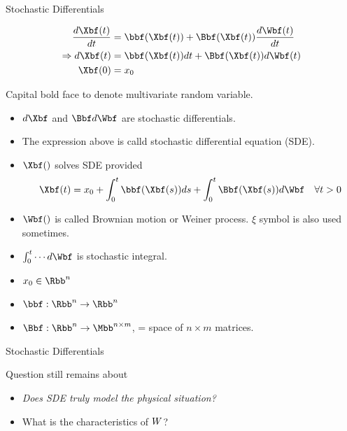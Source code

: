 \documentclass[aspectratio=169,xcolor=dvipsnames,svgnames,x11names,fleqn]{beamer}
\begin{document}
\begin{frame}{Stochastic Differentials}

    \footnotesize
    
    \begin{align*}
        \frac{d\Xbf(t)}{dt} & = \bbf(\Xbf(t)) + \Bbf(\Xbf(t))\frac{d\Wbf(t)}{dt}\\
        \Rightarrow d\Xbf(t) & = \bbf(\Xbf(t))dt + \Bbf(\Xbf(t))d\Wbf(t)\\
        \Xbf(0) & = x_0
    \end{align*}

    \vspace{3pt}
    Capital bold face to denote multivariate random variable.
    \vspace{3pt}

    \begin{itemize}
        \item $d\Xbf$ and $\Bbf d\Wbf$ are stochastic differentials.
        \item The expression above is calld stochastic differential equation (SDE).
        \item $\Xbf()$ solves SDE provided
        \begin{align*}
            \Xbf(t) = x_0 + \int_0^t \bbf (\Xbf (s))ds + \int_0^t \Bbf(\Xbf(s))d\Wbf \quad \forall t > 0
        \end{align*}

        \item $\Wbf()$ is called Brownian motion or Weiner process. $\xi$ symbol is also used sometimes.
        \item $\int_0^t \cdots d\Wbf$ is stochastic integral.
        \item $x_0 \in \Rbb^n$
        \item $\bbf: \Rbb^n \to \Rbb^n$
        \item $\Bbf: \Rbb^n \to \Mbb^{n\times m}$, = space of $n\times m$ matrices.
    \end{itemize}

\end{frame}

\begin{frame}{Stochastic Differentials}

    \begin{tcolorbox}[enhanced, colback=red!5, colframe=red!60!black, boxrule=0.5pt, leftrule = 2mm, rightrule = 0mm, toprule=0mm, bottomrule=0mm,  fonttitle=\bfseries]
    Question still remains about 
    \begin{itemize}
        \item \textit{Does SDE truly model the physical situation?}
        \item What is the characteristics of $W\bf$?
    \end{itemize}
    
    \end{tcolorbox}


\end{frame}
\end{document}

